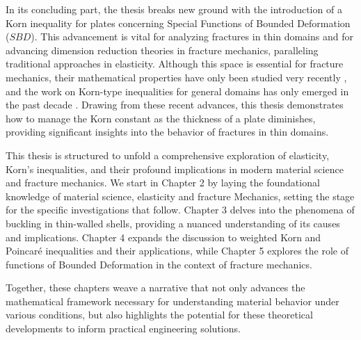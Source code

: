 In its concluding part, the thesis breaks new ground with the introduction of a Korn inequality for plates concerning Special Functions of Bounded Deformation ($SBD$). This advancement is vital for analyzing fractures in thin domains and for advancing dimension reduction theories in fracture mechanics, paralleling traditional approaches in elasticity. Although this space is essential for fracture mechanics, their mathematical properties have only been studied very recently \cite{Ambrosio1997, RogerBook, RogerPaper}, and the work on Korn-type inequalities for general domains has only emerged in the past decade \cite{kornBD1, kornBD2, kornBD3}. Drawing from these recent advances, this thesis demonstrates how to manage the Korn constant as the thickness of a plate diminishes, providing significant insights into the behavior of fractures in thin domains.

This thesis is structured to unfold a comprehensive exploration of elasticity, Korn's inequalities, and their profound implications in modern material science and fracture mechanics. We start in Chapter 2 by laying the foundational knowledge of material science, elasticity and fracture Mechanics, setting the stage for the specific investigations that follow. Chapter 3 delves into the phenomena of buckling in thin-walled shells, providing a nuanced understanding of its causes and implications. Chapter 4 expands the discussion to weighted Korn and Poincaré inequalities and their applications, while Chapter 5 explores the role of functions of Bounded Deformation in the context of fracture mechanics.

Together, these chapters weave a narrative that not only advances the mathematical framework necessary for understanding material behavior under various conditions, but also highlights the potential for these theoretical developments to inform practical engineering solutions.

